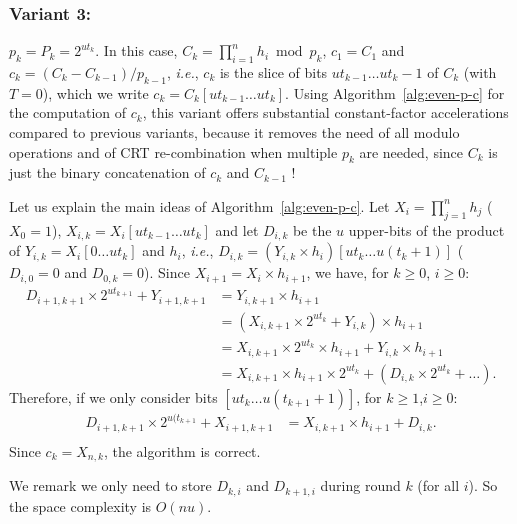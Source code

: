 \documentclass[11pt]{llncs}
\begin{document}
\subsubsection{Variant 3:} $p_k = P_k = 2^{ut_k}$. 
In this case, $C_k = \prod_{i=1}^n h_i \bmod p_k$, $c_1 = C_1$ and $c_k = (C_k - C_{k-1}) / p_{k-1}$, {\it i.e.}, $c_k$ is the slice of bits $ut_{k-1}\dots ut_k-1$ of $C_k$ (with $T = 0$), which we write $c_k = C_k[ut_{k-1}\dots ut_k]$.
Using Algorithm~\ref{alg:even-p-c} for the computation of $c_k$, this variant offers substantial constant-factor accelerations compared to previous variants, because it removes the need of all modulo operations and of CRT re-combination when multiple $p_k$ are needed, since $C_k$ is just the binary concatenation of $c_k$ and $C_{k-1}$ !

Let us explain the main ideas of Algorithm~\ref{alg:even-p-c}.
Let $X_i = \prod_{j=1}^n h_j$ ($X_0 = 1$), $X_{i,k} = X_i[ut_{k-1}\dots ut_{k}]$ and let $D_{i,k}$ be the $u$ upper-bits of the product of $Y_{i,k} = X_i[0\dots ut_{k}]$ and $h_i$, {\it i.e.}, $D_{i,k} = (Y_{i,k} \times h_i)[ut_k\dots u(t_k+1)]$ ($D_{i,0} = 0$ and $D_{0,k} = 0$).
Since $X_{i+1} = X_i \times h_{i+1}$, we have, for $k \ge 0$, $i \ge 0$:
\begin{align*}
  D_{i+1,k+1} \times 2^{ut_{k+1}} + Y_{i+1,k+1} &= Y_{i,k+1} \times h_{i+1} \\
                 &= (X_{i,k+1} \times 2^{ut_{k}} + Y_{i,k}) \times h_{i+1} \\
                 &= X_{i,k+1} \times 2^{ut_k} \times h_{i+1} + Y_{i,k} \times h_{i+1} \\
                 &= X_{i,k+1}  \times h_{i+1} \times 2^{ut_k} + (D_{i,k} \times 2^{ut_k} + \dots).
\end{align*}
Therefore, if we only consider bits $[ut_k \dots u(t_{k+1}+1)]$, for $k\ge1$,$i\ge0$:
\begin{align*}
  D_{i+1,k+1} \times 2^{u(t_{k+1}} + X_{i+1,k+1} &= X_{i,k+1} \times h_{i+1} + D_{i,k}. \\
\end{align*}
Since $c_k = X_{n,k}$, the algorithm is correct.

We remark we only need to store $D_{k,i}$ and $D_{k+1,i}$ during round $k$ (for all $i$).
So the space complexity is $O(nu)$.
\end{document}
